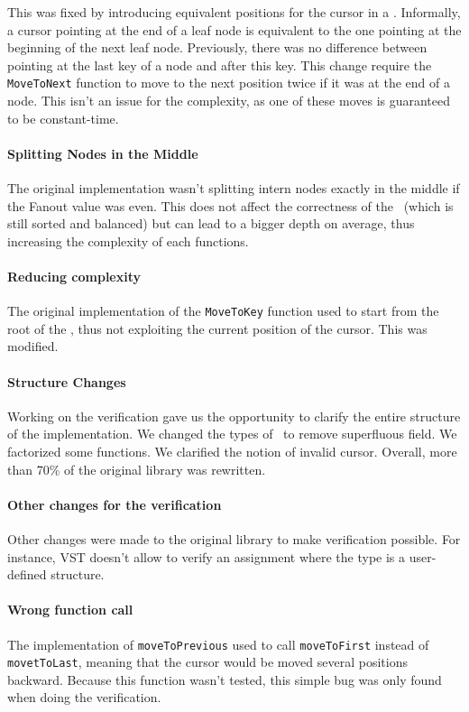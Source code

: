 This was fixed by introducing equivalent positions for the cursor in a \btree.
Informally, a cursor pointing at the end of a leaf node is equivalent to the one pointing at the beginning of the next leaf node.
Previously, there was no difference between pointing at the last key of a node and after this key.
This change require the \texttt{MoveToNext} function to move to the next position twice if it was at the end of a node.
This isn't an issue for the complexity, as one of these moves is guaranteed to be constant-time.

\paragraph{Splitting Nodes in the Middle}
The original implementation wasn't splitting intern nodes exactly in the middle if the Fanout value was even.
This does not affect the correctness of the \btree\ (which is still sorted and balanced) but can lead to a bigger depth on average, thus increasing the complexity of each functions.

\paragraph{Reducing complexity}
The original implementation of the \texttt{MoveToKey} function used to start from the root of the \btree, thus not exploiting the current position of the cursor. This was modified.

\paragraph{Structure Changes}
Working on the verification gave us the opportunity to clarify the entire structure of the implementation.
We changed the types of \btrees\ to remove superfluous field. We factorized some functions. We clarified the notion of invalid cursor.
Overall, more than 70\% of the original library was rewritten.

\paragraph{Other changes for the verification}
Other changes were made to the original library to make verification possible.
For instance, VST doesn't allow to verify an assignment where the type is a user-defined structure.

\paragraph{Wrong function call} The implementation of \texttt{moveToPrevious} used to call \texttt{moveToFirst} instead of \texttt{movetToLast}, meaning that the cursor would be moved several positions backward.
Because this function wasn't tested, this simple bug was only found when doing the verification.
